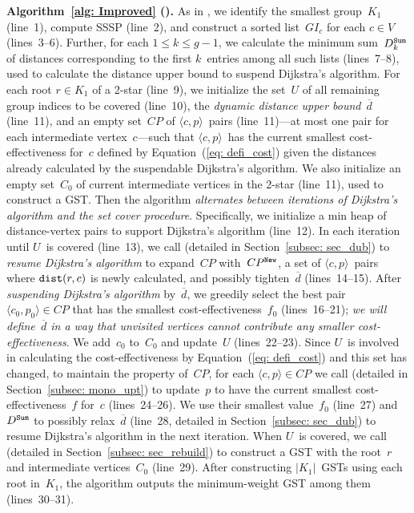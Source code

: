 
\textbf{Algorithm~\ref{alg: Improved} (\Improved).}
As in \Basic, we identify the smallest group~$K_1$ (line~1), compute SSSP (line~2), and construct a sorted list~$GI_c$ for each $c \in V$ (lines~3--6). Further, for each $1 \leq k \leq g-1$, we calculate the minimum sum~$D^{\texttt{Sum}}_k$ of distances corresponding to the first $k$~entries among all such lists (lines~7--8), used to calculate the distance upper bound to suspend Dijkstra's algorithm. For each root $r \in K_1$ of a 2-star (line~9), we initialize the set~$U$ of all remaining group indices to be covered (line~10), the \emph{dynamic distance upper bound}~$\overline{d}$ (line~11), and an empty set~$CP$ of $\langle c,p \rangle$~pairs (line~11)---at most one pair for each intermediate vertex~$c$---such that $\langle c,p \rangle$~has the current smallest cost-effectiveness for~$c$ defined by Equation~(\ref{eq: defi_cost}) given the distances already calculated by the suspendable Dijkstra's algorithm.
We also initialize an empty set~$C_0$ of current intermediate vertices in the 2-star (line~11), used to construct a GST. Then the algorithm \emph{alternates between iterations of Dijkstra's algorithm and the set cover procedure}. Specifically, we initialize a min heap of distance-vertex pairs to support Dijkstra's algorithm (line~12). In each iteration until $U$~is covered (line~13), we call \PartialDijkstra (detailed in Section~\ref{subsec: sec_dub}) to \emph{resume Dijkstra's algorithm} to expand~$CP$ with~$CP^{\mathtt{New}}$, a set of $\langle c,p \rangle$~pairs where $\mathtt{dist}(r,c)$ is newly calculated, and possibly tighten~$\overline{d}$ (lines~14--15). After \emph{suspending Dijkstra's algorithm} by~$\overline{d}$, we greedily select the best pair $\langle c_0,p_0 \rangle \in CP$ that has the smallest cost-effectiveness~$f_0$ (lines~16--21); \emph{we will define~$\overline{d}$ in a way that unvisited vertices cannot contribute any smaller cost-effectiveness}. We add~$c_0$ to~$C_0$ and update~$U$ (lines~22--23). Since $U$~is involved in calculating the cost-effectiveness by Equation~(\ref{eq: defi_cost}) and this set has changed, to maintain the property of~$CP$, for each $\langle c,p \rangle \in CP$ we call \UpdateCandidate (detailed in Section~\ref{subsec: mono_upt}) to update~$p$ to have the current smallest cost-effectiveness~$f$ for~$c$ (lines~24--26). We use their smallest value~$f_0$ (line~27) and~$D^{\texttt{Sum}}$ to possibly relax~$\overline{d}$ (line~28, detailed in Section~\ref{subsec: sec_dub}) to resume Dijkstra's algorithm in the next iteration. When $U$~is covered, we call \ConstructTree (detailed in Section~\ref{subsec: sec_rebuild}) to construct a GST with the root~$r$ and intermediate vertices~$C_0$ (line~29). After constructing $|K_1|$~GSTs using each root in~$K_1$, the algorithm outputs the minimum-weight GST among them (lines~30--31).

